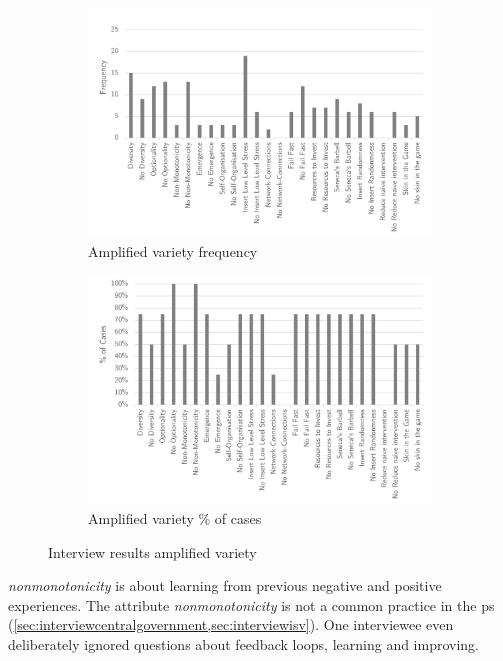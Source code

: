 \begin{figure}[H]
	\centering
	\begin{subfigure}[H]{0.5\textwidth}
		\centering
		\includegraphics[width=0.95\linewidth]{images/amplified_frequency}
		\caption[Amplified variety frequency]{Amplified variety frequency}
		\label{fig:amplifiedfrequency}
	\end{subfigure}%
	\begin{subfigure}[H]{0.5\textwidth}
		\centering
		\includegraphics[width=0.95\linewidth]{images/amplified_cases}
		\caption[Amplified variety \% of cases]{Amplified variety \% of cases}
		\label{fig:amplifiedcases}
	\end{subfigure}
	\caption[Interview results amplified variety]{Interview results amplified variety}
	\label{fig:interviewamplifiedvariety}
\end{figure}
\textit{\Gls{nonmonotonicity}} is about learning from previous negative and positive experiences. The \gls{attribute} \textit{\gls{nonmonotonicity}} is not a common practice in the \gls{ps} (\cref{sec:interviewcentralgovernment,sec:interviewisv}). One interviewee even deliberately ignored questions about feedback loops, learning and improving.

